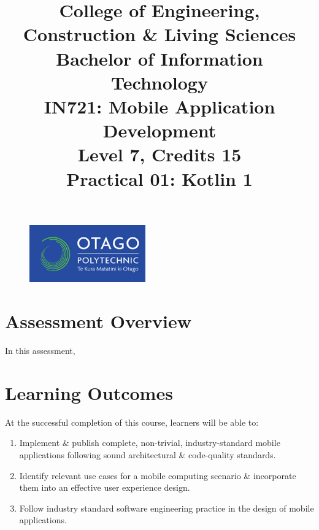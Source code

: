 \documentclass{article}
\author{}
\begin{document}
\begin{figure}
    \centering
    \includegraphics[width=50mm]{../../resources/img/logo.png}
\end{figure}

\title{College of Engineering, Construction \& Living Sciences\\Bachelor of Information Technology\\IN721: Mobile Application Development\\Level 7, Credits 15\\\textbf{Practical 01: Kotlin 1}}
\date{}
\maketitle

\section*{Assessment Overview}
In this assessment, 

\section*{Learning Outcomes}
At the successful completion of this course, learners will be able to: 
\begin{enumerate}
	\item Implement \& publish complete, non-trivial, industry-standard mobile applications following sound architectural \& code-quality standards.
	\item Identify relevant use cases for a mobile computing scenario \& incorporate them into an effective user experience design.
	\item Follow industry standard software engineering practice in the design of mobile applications.
\end{enumerate} 
\end{document}
